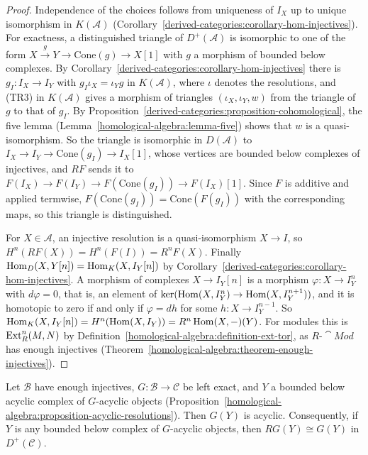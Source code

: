 \begin{proof}
Independence of the choices follows from uniqueness of $I_X$ up to unique isomorphism in $K(\mathcal{A})$
(Corollary~\ref{derived-categories:corollary-hom-injectives}). For exactness, a distinguished triangle of $D^+(\mathcal{A})$ is isomorphic to one
of the form $X \xrightarrow{g} Y \to \mathrm{Cone}(g) \to X[1]$ with $g$ a morphism of bounded below complexes. By
Corollary~\ref{derived-categories:corollary-hom-injectives} there is $g_I \colon I_X \to I_Y$ with $g_I\iota_X = \iota_Y g$ in $K(\mathcal{A})$, where
$\iota$ denotes the resolutions, and (TR3) in $K(\mathcal{A})$ gives a morphism of triangles $(\iota_X, \iota_Y, w)$ from the triangle of $g$ to that of
$g_I$. By Proposition~\ref{derived-categories:proposition-cohomological}, the five lemma (Lemma~\ref{homological-algebra:lemma-five}) shows
that $w$ is a quasi-isomorphism. So the triangle is isomorphic in $D(\mathcal{A})$ to $I_X \to I_Y \to \mathrm{Cone}(g_I) \to I_X[1]$, whose vertices are
bounded below complexes of injectives, and $RF$ sends it to $F(I_X) \to F(I_Y) \to F(\mathrm{Cone}(g_I)) \to F(I_X)[1]$. Since $F$ is additive and applied
termwise, $F(\mathrm{Cone}(g_I)) = \mathrm{Cone}(F(g_I))$ with the corresponding maps, so this triangle is distinguished.

For $X \in \mathcal{A}$, an injective resolution is a quasi-isomorphism $X \to I$, so $H^n(RF(X)) = H^n(F(I)) = R^nF(X)$. Finally
$\operatorname{Hom}_D(X, Y[n]) = \operatorname{Hom}_K(X, I_Y[n])$ by Corollary~\ref{derived-categories:corollary-hom-injectives}. A morphism of complexes $X \to I_Y[n]$ is a
morphism $\varphi \colon X \to I_Y^n$ with $d\varphi = 0$, that is, an element of $\ker(\operatorname{Hom}(X, I_Y^n) \to \operatorname{Hom}(X, I_Y^{n+1}))$, and it is homotopic to
zero if and only if $\varphi = dh$ for some $h \colon X \to I_Y^{n-1}$. So $\operatorname{Hom}_K(X, I_Y[n]) = H^n(\operatorname{Hom}(X, I_Y)) = R^n\operatorname{Hom}(X, -)(Y)$. For modules this
is $\operatorname{Ext}^n_R(M, N)$ by Definition~\ref{homological-algebra:definition-ext-tor}, as $R\text{-}\cat{Mod}$ has enough injectives
(Theorem~\ref{homological-algebra:theorem-enough-injectives}).
\end{proof}

\begin{lemma}\label{derived-categories:lemma-acyclic-complexes}
Let $\mathcal{B}$ have enough injectives, $G \colon \mathcal{B} \to \mathcal{C}$ be left exact, and $Y$ a bounded below acyclic complex of
$G$-acyclic objects (Proposition~\ref{homological-algebra:proposition-acyclic-resolutions}). Then $G(Y)$ is acyclic.
Consequently, if $Y$ is any bounded below complex of $G$-acyclic objects, then $RG(Y) \cong G(Y)$ in $D^+(\mathcal{C})$.
\end{lemma}

